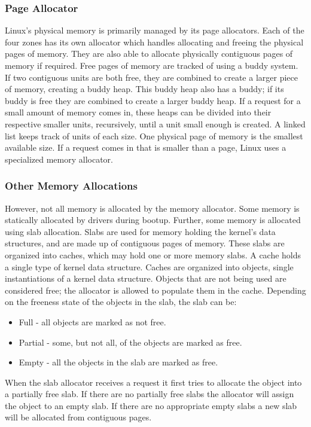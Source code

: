 \documentclass[12pt]{article}
\begin{document}
\subsubsection{Page Allocator}
Linux's physical memory is primarily managed by its page allocators. Each of the four zones has its own allocator which handles allocating and freeing the physical pages of memory. They are also able to allocate physically contiguous pages of memory if required. Free pages of memory are tracked of using a buddy system. If two contiguous units  are both free, they are combined to create a larger piece of memory, creating a buddy heap. This buddy heap also has a buddy; if its buddy is free they are combined to create a larger buddy heap. If a request for a small amount of memory comes in, these heaps can be divided into their respective smaller units, recursively, until a unit small enough is created. A linked list keeps track of units of each size. One physical page of memory is the smallest available size. If a request comes in that is smaller than a page, Linux uses a specialized memory allocator.

\subsubsection{Other Memory Allocations}
However, not all memory is allocated by the memory allocator. Some memory is statically allocated by drivers during bootup. Further, some memory is allocated using slab allocation. Slabs are used for memory holding the kernel's data structures, and are made up of contiguous pages of memory. These slabs are organized into caches, which may hold one or more memory slabs. A cache holds a single type of kernel data structure. Caches are organized into objects, single instantiations of a kernel data structure. Objects that are not being used are considered free; the allocator is allowed to populate them in the cache. Depending on the freeness state of the objects in the slab, the slab can be:
\begin{itemize}
\item Full - all objects are marked as not free.
\item Partial - some, but not all, of the objects are marked as free.
\item Empty - all the objects in the slab are marked as free.
\end{itemize}
When the slab allocator receives a request it first tries to allocate the object into a partially free slab. If there are no partially free slabs the allocator will assign the object to an empty slab. If there are no appropriate empty slabs a new slab will be allocated from contiguous pages.
\end{document}
